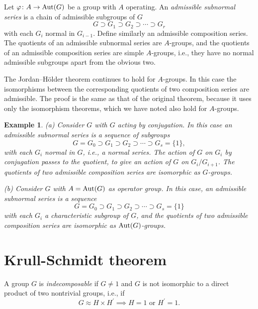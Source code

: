 \documentclass[a4paper,11pt,final,openany]{memoir}%
\newtheorem{example}[X]{Example}
\theoremstyle{nonumberplain}
\begin{document}
Let $\varphi\colon A\rightarrow\operatorname{Aut}(G)$ be a group with $A$ operating. An
\emph{admissible subnormal series\/}%
is a chain of admissible subgroups of $G$
\[
G\supset G_{1}\supset G_{2}\supset\cdots\supset G_{r}%
\]
with each $G_{i}$ normal in $G_{i-1}$. Define similarly an admissible
composition series. The quotients of an admissible subnormal series are
$A$-groups, and the quotients of an admissible composition series are simple
$A$-groups, i.e., they have no normal admissible subgroups apart from the
obvious two.

The Jordan--H\"older theorem continues to hold for $A$-groups. In this case
the isomorphisms between the corresponding quotients of two composition series
are admissible. The proof is the same as that of the original theorem, because
it uses only the isomorphism theorems, which we have noted also hold for $A$-groups.

\begin{example}
\label{ns27}(a) Consider $G$ with $G$ acting by conjugation. In this case an
admissible subnormal series is a sequence of subgroups
\[
G=G_{0}\supset G_{1}\supset G_{2}\supset\cdots\supset G_{s}=\{1\},
\]
with each $G_{i}$ normal in $G$, i.e., a normal series. The action of $G$ on
$G_{i}$ by conjugation passes to the quotient, to give an action of $G$ on
$G_{i}/G_{i+1}$. The quotients of two admissible composition series are
isomorphic as $G$-groups.

(b) Consider $G$ with $A=\operatorname{Aut}(G)$ as operator group. In this case, an
admissible subnormal series is a sequence
\[
G=G_{0}\supset G_{1}\supset G_{2}\supset\cdots\supset G_{s}=\{1\}
\]
with each $G_{i}$ a characteristic subgroup of $G$, and the quotients of two
admissible composition series are isomorphic as $\operatorname{Aut}(G)$-groups.
\end{example}

\section{Krull-Schmidt theorem}

A group $G$ is \emph{indecomposable}%
if $G\neq1$ and $G$ is not isomorphic to a direct product of two nontrivial
groups, i.e., if
\[
G\approx H\times H^{\prime}\implies H=1\text{ or }H^{\prime}=1.
\]
\end{document}
